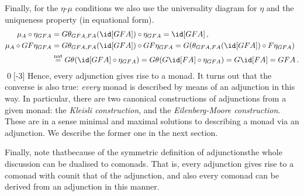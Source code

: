 \documentclass[12pt]{article}
\begin{document}
Finally, for the $\eta$-$\mu$ conditions we also use the universality diagram for $\eta$ and the uniqueness property (in equational form).
\begin{align*}
\mu_A\circ\eta_{GFA} &= G\theta_{GFA,FA}(\id[GFA])\circ\eta_{GFA} = \id[GFA]\,, \\
\mu_A\circ GF\eta_{GFA} &= G\theta_{GFA,FA}(\id[GFA])\circ GF\eta_{GFA} = G(\theta_{GFA,FA}(\id[GFA])\circ F\eta_{GFA}) \\
    &\overset{\text{nat}}{=} G\theta_{}(\id[GFA]\circ\eta_{GFA}) = G\theta_{}(G\id[FA]\circ\eta_{GFA}) = G\id[FA]  = GFA\,.
\end{align*}
\qed[-3]
%
Hence, every adjunction gives rise to a monad. It turns out that the converse is also true: \emph{every} monad is described by means of an adjunction
in this way. In particular, there are two canonical constructions of adjunctions from a given monad: the \emph{Kleisli construction}, and the
\emph{Eilenberg-Moore construction}. These are in a sense minimal and maximal solutions to describing a monad via an adjunction. We describe the former
one in the next section. %

Finally, note that\HY because of the symmetric definition of adjunctions\HY the whole discussion can be dualised to comonads. That is, every adjunction
gives rise to a comonad with counit that of the adjunction, and also every comonad can be derived from an adjunction in this manner.
\end{document}
